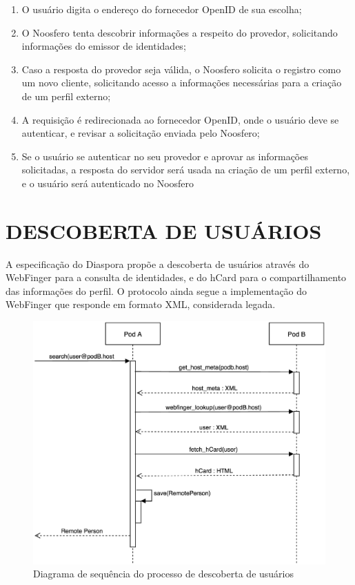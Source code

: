 \begin{enumerate}
  \item{O usuário digita o endereço do fornecedor OpenID de sua escolha;}
  \item{O Noosfero tenta descobrir informações a respeito do provedor, solicitando
        informações do emissor de identidades;}
  \item{Caso a resposta do provedor seja válida, o Noosfero solicita o registro como
        um novo cliente, solicitando acesso a informações necessárias para a criação
        de um perfil externo;}
  \item{A requisição é redirecionada ao fornecedor OpenID, onde o usuário deve se
        autenticar, e revisar a solicitação enviada pelo Noosfero;}
  \item{Se o usuário se autenticar no seu provedor e aprovar as informações
        solicitadas, a resposta do servidor será usada na criação de um perfil
        externo, e o usuário será autenticado no Noosfero}
\end{enumerate}



\section{DESCOBERTA DE USUÁRIOS}

A especificação do Diaspora propõe a descoberta de usuários através do WebFinger
para a consulta de identidades, e do hCard para o compartilhamento das informações
do perfil. O protocolo ainda segue a implementação do WebFinger que responde em
formato XML, considerada legada.

\begin{figure}[h]
	\centering
		\includegraphics[keepaspectratio=true,scale=0.6]{figuras/seq_descoberta.eps}
	\caption{Diagrama de sequência do processo de descoberta de usuários}
	\label{fig:seq_descoberta}
\end{figure}

